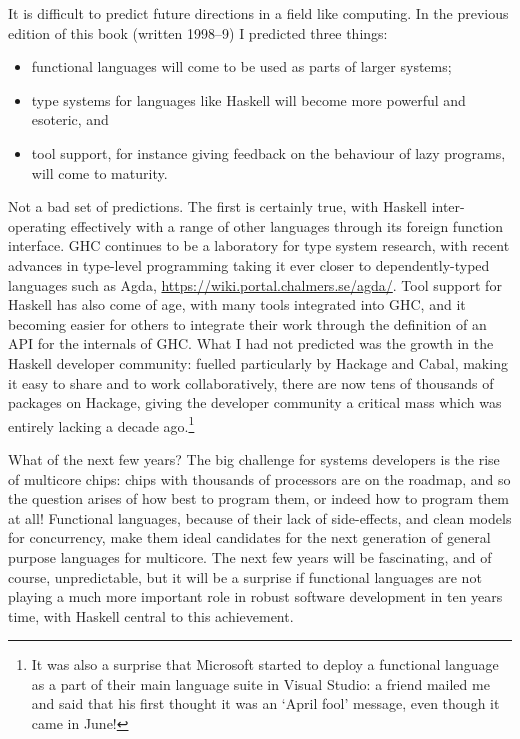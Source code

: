 It is difficult to predict future directions in a field like computing. In the previous edition of this book (written 1998--9) I predicted three things:
\begin{itemize}
\item functional languages will come to be used as parts of larger systems;
\item type systems for languages like Haskell will become more powerful and esoteric, and
\item tool support, for instance giving feedback on the behaviour of lazy programs, will come to maturity.
\end{itemize}
Not a bad set of predictions. The first is certainly true, with Haskell inter-operating effectively with a range of other languages through its foreign function interface. GHC continues to be a laboratory for type system research, with recent advances in type-level programming taking it ever closer to dependently-typed languages such as Agda, \url{https://wiki.portal.chalmers.se/agda/}.
Tool support for Haskell has also come of age, with many tools integrated into GHC, and it becoming easier for others to integrate their work through the definition of an API for the internals of GHC. What I had not predicted was the growth in the Haskell developer community: fuelled particularly by Hackage and Cabal, making it easy to share and to work collaboratively, there are now tens of thousands of packages on Hackage, giving the developer community a critical mass which was entirely lacking a decade ago.\footnote{It was also a surprise that Microsoft started to deploy a functional language as a part of their main language suite in Visual Studio: a friend mailed me and said that his first thought it was an `April fool' message, even though it came in June!}

What of the next few years? The big challenge for systems developers is the rise of multicore chips: chips with thousands of processors are on the roadmap, and so the question arises of how best to program them, or indeed how to program them at all! Functional languages, because of their lack of side-effects, and clean models for concurrency, make them ideal candidates for the next generation of general purpose languages for multicore. The next few years will be fascinating, and of course, unpredictable, but it will be a surprise if functional languages are not playing a much more important role in robust software development in ten years time, with Haskell central to this achievement.


%
